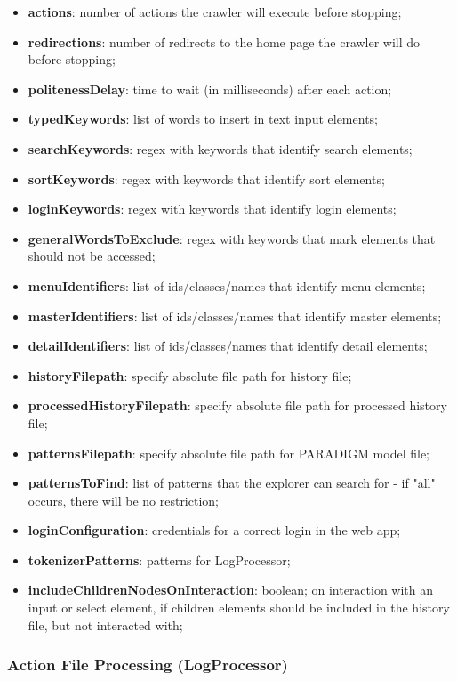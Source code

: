 \begin{itemize}
\item[] \textbf{actions}: number of actions the crawler will execute before stopping;
\item[] \textbf{redirections}: number of redirects to the home page the crawler will do before stopping; 
\item[] \textbf{politenessDelay}: time to wait (in milliseconds) after each action;
\item[] \textbf{typedKeywords}: list of words to insert in text input elements;
\item[] \textbf{searchKeywords}: regex with keywords that identify search elements;
\item[] \textbf{sortKeywords}: regex with keywords that identify sort elements;
\item[] \textbf{loginKeywords}: regex with keywords that identify login elements;
\item[] \textbf{generalWordsToExclude}: regex with keywords that mark elements that should not be accessed;
\item[] \textbf{menuIdentifiers}: list of ids/classes/names that identify menu elements;
\item[] \textbf{masterIdentifiers}: list of ids/classes/names that identify master elements;
\item[] \textbf{detailIdentifiers}: list of ids/classes/names that identify detail elements;
\item[] \textbf{historyFilepath}: specify absolute file path for history file;
\item[] \textbf{processedHistoryFilepath}: specify absolute file path for processed history file;
\item[] \textbf{patternsFilepath}: specify absolute file path for PARADIGM model file;
\item[] \textbf{patternsToFind}: list of patterns that the explorer can search for - if "all" occurs, there will be no restriction;
\item[] \textbf{loginConfiguration}: credentials for a correct login in the web app;		
\item[] \textbf{tokenizerPatterns}: patterns for LogProcessor;
\item[] \textbf{includeChildrenNodesOnInteraction}: boolean; on interaction with an input or select element, if children elements should be included  in the history file, but not interacted with;
\end{itemize}

\subsubsection{Action File Processing (LogProcessor)}\label{sec:fp}


